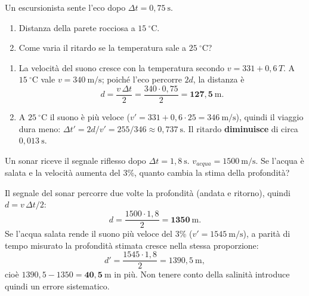 \begin{question}[ID=2.3, subtitle={Eco in montagna — distanza dalla parete rocciosa}, tags={eco, distanza}, difficulty=media]
Un escursionista sente l'eco dopo $\Delta t = 0{,}75\ \mathrm{s}$.
\begin{enumerate}
\item Distanza della parete rocciosa a $15\ ^\circ\mathrm{C}$.
\item Come varia il ritardo se la temperatura sale a $25\ ^\circ\mathrm{C}$?
\end{enumerate}
\begin{solution}
\begin{enumerate}
\item La velocità del suono cresce con la temperatura secondo $v = 331 + 0{,}6\,T$. A $15\ ^\circ\mathrm{C}$ vale $v = 340\ \mathrm{m/s}$; poiché l'eco percorre $2d$, la distanza è
\[
d = \frac{v\,\Delta t}{2} = \frac{340\cdot 0{,}75}{2} = \mathbf{127{,}5\ \mathrm{m}}.
\]
\item A $25\ ^\circ\mathrm{C}$ il suono è più veloce ($v' = 331 + 0{,}6\cdot 25 = 346\ \mathrm{m/s}$), quindi il viaggio dura meno: $\Delta t' = 2d/v' = 255/346 \approx 0{,}737\ \mathrm{s}$. Il ritardo \textbf{diminuisce} di circa $0{,}013\ \mathrm{s}$.
\end{enumerate}
\end{solution}
\end{question}

\begin{question}[ID=2.4, subtitle={Sonar — profondità del fondale e variazione con acqua salata}, tags={eco, sonar, acqua}, difficulty=difficile]
Un sonar riceve il segnale riflesso dopo $\Delta t = 1{,}8\ \mathrm{s}$. $v_{acqua} = 1500\ \mathrm{m/s}$.
Se l'acqua è salata e la velocità aumenta del 3\%, quanto cambia la stima della profondità?
\begin{solution}
Il segnale del sonar percorre due volte la profondità (andata e ritorno), quindi $d = v\,\Delta t/2$:
\[
d = \frac{1500\cdot 1{,}8}{2} = \mathbf{1350\ \mathrm{m}}.
\]
Se l'acqua salata rende il suono più veloce del 3\% ($v' = 1545\ \mathrm{m/s}$), a parità di tempo misurato la profondità stimata cresce nella stessa proporzione:
\[
d' = \frac{1545\cdot 1{,}8}{2} = 1390{,}5\ \mathrm{m},
\]
cioè $1390{,}5 - 1350 = \mathbf{40{,}5\ \mathrm{m}}$ in più. Non tenere conto della salinità introduce quindi un errore sistematico.
\end{solution}
\end{question}

